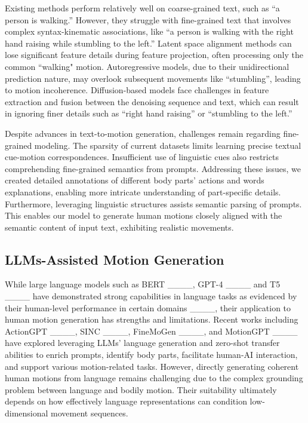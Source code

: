 Existing methods perform relatively well on coarse-grained text, such as ``a person is walking.'' However, they struggle with fine-grained text that involves complex syntax-kinematic associations, like ``a person is walking with the right hand raising while stumbling to the left.'' Latent space alignment methods can lose significant feature details during feature projection, often processing only the common ``walking" motion. Autoregressive models, due to their unidirectional prediction nature, may overlook subsequent movements like ``stumbling'', leading to motion incoherence. Diffusion-based models face challenges in feature extraction and fusion between the denoising sequence and text, which can result in ignoring finer details such as ``right hand raising'' or ``stumbling to the left.''

Despite advances in text-to-motion generation, challenges remain regarding fine-grained modeling. The sparsity of current datasets limits learning precise textual cue-motion correspondences. Insufficient use of linguistic cues also restricts comprehending fine-grained semantics from prompts. Addressing these issues, we created detailed annotations of different body parts' actions and words explanations, enabling more intricate understanding of part-specific details. Furthermore, leveraging linguistic structures assists semantic parsing of prompts. This enables our model to generate human motions closely aligned with the semantic content of input text, exhibiting realistic movements.

\subsection{LLMs-Assisted Motion Generation}\label{sec2_2}

While large language models such as BERT ____, GPT-4 ____ and T5 ____ have demonstrated strong capabilities in language tasks as evidenced by their human-level performance in certain domains ____, their application to human motion generation has strengths and limitations. Recent works including ActionGPT ____, SINC ____, FineMoGen ____, and MotionGPT ____ have explored leveraging LLMs' language generation and zero-shot transfer abilities to enrich prompts, identify body parts, facilitate human-AI interaction, and support various motion-related tasks. However, directly generating coherent human motions from language remains challenging due to the complex grounding problem between language and bodily motion. Their suitability ultimately depends on how effectively language representations can condition low-dimensional movement sequences.

